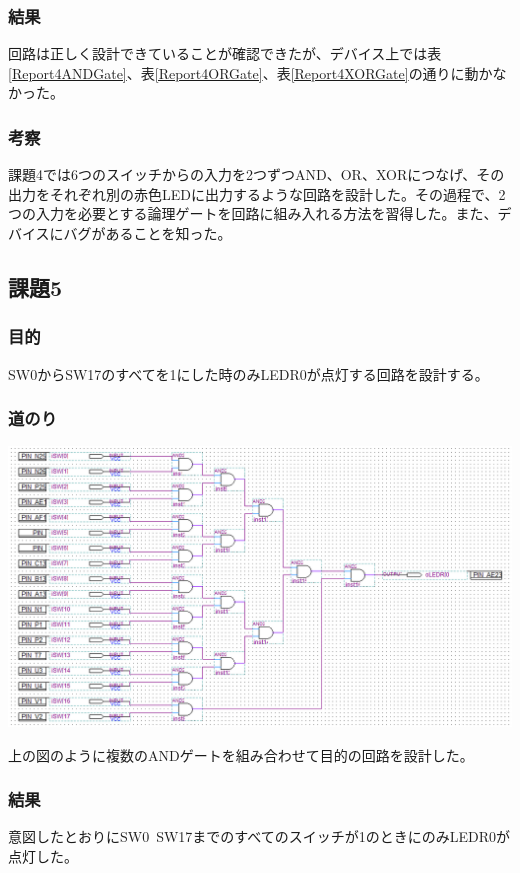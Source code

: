 \documentclass[a4paper]{jarticle}
\begin{document}
\subsubsection{結果}
回路は正しく設計できていることが確認できたが、デバイス上では表\ref{Report4ANDGate}、表\ref{Report4ORGate}、表\ref{Report4XORGate}の通りに動かなかった。
\subsubsection{考察}
課題4では6つのスイッチからの入力を2つずつAND、OR、XORにつなげ、その出力をそれぞれ別の赤色LEDに出力するような回路を設計した。その過程で、2つの入力を必要とする論理ゲートを回路に組み入れる方法を習得した。また、デバイスにバグがあることを知った。
\subsection{課題5}
\subsubsection{目的}
SW0からSW17のすべてを1にした時のみLEDR0が点灯する回路を設計する。
\subsubsection{道のり}
\begin{center}
	\includegraphics[width=15cm]{work5.PNG}
\end{center}
上の図のように複数のANDゲートを組み合わせて目的の回路を設計した。
\subsubsection{結果}
意図したとおりにSW0~SW17までのすべてのスイッチが1のときにのみLEDR0が点灯した。
\end{document}
